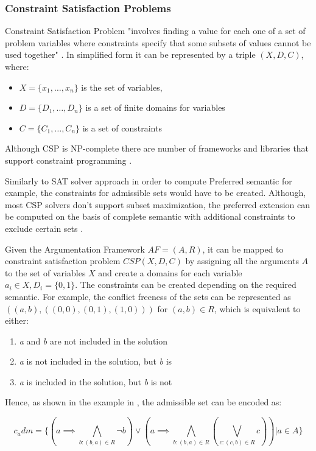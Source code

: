 \subsubsection{Constraint Satisfaction Problems}
Constraint Satisfaction Problem "involves finding a value for each one of a set of problem variables where constraints specify that some subsets of values cannot be used together" \citep{csp1}. In simplified form it can be represented by a triple $(X, D, C)$, where:
\begin{itemize}
	\item $X = \{x_1, \ldots, x_n\} $ is the set of variables,
	\item $ D = \{D_1, \ldots, D_n \} $ is a set of finite domains for variables
	\item $ C = \{ C_1, \ldots, C_n \} $ is a set of constraints
\end{itemize}
Although CSP is NP-complete there are number of frameworks and libraries that support constraint programming \citep{solvingMethods}.

Similarly to SAT solver approach in order to compute Preferred semantic for example, the constraints for admissible sets would have to be created. Although, most CSP solvers don't support subset maximization, the preferred extension can be computed on the basis of complete semantic with additional constraints to exclude certain sets \citep{solvingMethods}.

Given the Argumentation Framework $ AF = (A,R)$, it can be mapped to constraint satisfaction problem $ CSP(X,D,C) $ by assigning all the arguments $A$ to the set of variables $X$ and create a domains for each variable $ a_i \in X, D_i = \{0,1\} $. The constraints can be created depending on the required semantic. For example, the conflict freeness of the sets can be represented as $((a,b),((0,0), (0,1),(1,0)))$ for $(a,b) \in R$, which is equivalent to either:
\begin{enumerate}
	\item \textit{a} and \textit{b} are not included in the solution
	\item \textit{a} is not included in the solution, but \textit{b} is
	\item \textit{a} is included in the solution, but \textit{b} is not
\end{enumerate}

Hence, as shown in the example in \citet{solvingMethods}, the admissible set can be encoded as:

\begin{equation}
c_adm = \{(a \implies \bigwedge\limits_{ b : (b,a) \in R } \neg  b) \lor (a \implies \bigwedge\limits_{b:(b,a) \in R} (\bigvee\limits_{c:(c,b) \in R} c) ) | a \in A\}
\end{equation}

